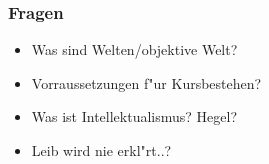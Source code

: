 \documentclass[emulatestandardclasses]{scrartcl}
\begin{document}
\subsubsection{Fragen}

\begin{itemize}
  \item Was sind Welten/objektive Welt?
  \item Vorraussetzungen f"ur Kursbestehen?
  \item Was ist Intellektualismus? Hegel?
  \item Leib wird nie erkl"rt..?
\end{itemize}


\newpage
%


\end{document}
